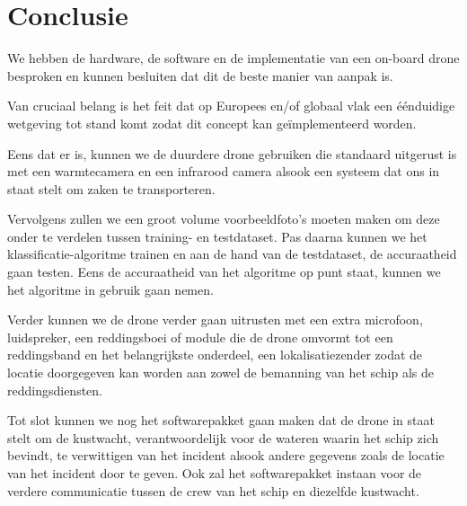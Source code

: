 
\chapter{Conclusie}
\label{ch:conclusie}


We hebben de hardware, de software en de implementatie van een on-board drone besproken en kunnen besluiten dat dit de beste manier van aanpak is. 

Van cruciaal belang is het feit dat op Europees en/of globaal vlak een éénduidige wetgeving tot stand komt zodat dit concept kan geïmplementeerd worden. 

Eens dat er is, kunnen we de duurdere drone gebruiken die standaard uitgerust is met een warmtecamera en een infrarood camera alsook een systeem dat ons in staat stelt om zaken te transporteren. 

Vervolgens zullen we een groot volume voorbeeldfoto's moeten maken om deze onder te verdelen tussen training- en testdataset. Pas daarna kunnen we het klassificatie-algoritme trainen en aan de hand van de testdataset, de accuraatheid gaan testen. Eens de accuraatheid van het algoritme op punt staat, kunnen we het algoritme in gebruik gaan nemen. 

Verder kunnen we de drone verder gaan uitrusten met een extra microfoon, luidspreker, een reddingsboei of module die de drone omvormt tot een reddingsband en het belangrijkste onderdeel, een lokalisatiezender zodat de locatie doorgegeven kan worden aan zowel de bemanning van het schip als de reddingsdiensten. 

Tot slot kunnen we nog het softwarepakket gaan maken dat de drone in staat stelt om de kustwacht, verantwoordelijk voor de wateren waarin het schip zich bevindt, te verwittigen van het incident alsook andere gegevens zoals de locatie van het incident door te geven. Ook zal het softwarepakket instaan voor de verdere communicatie tussen de crew van het schip en diezelfde kustwacht.

